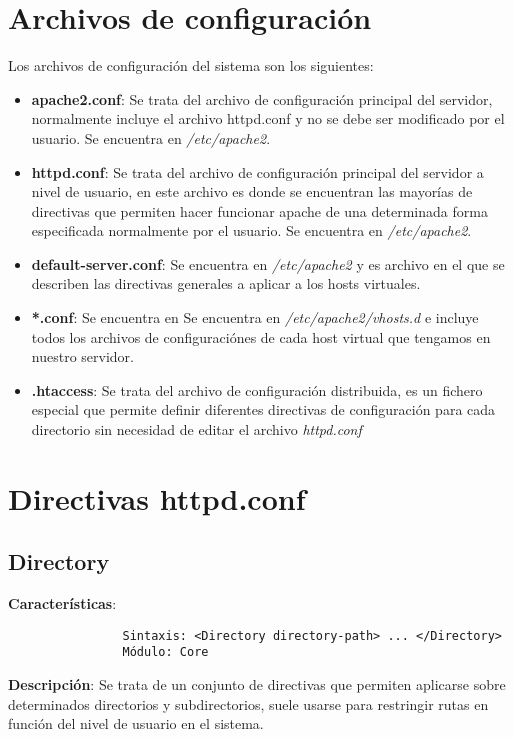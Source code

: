 \documentclass[a4paper, 11pt]{article} %
\begin{document}
\section{Archivos de configuración}
Los archivos de configuración del sistema son los siguientes: \cite{url3}
\begin{itemize}
	\item \textbf{apache2.conf}: Se trata del archivo de configuración principal del servidor, normalmente incluye el archivo httpd.conf y no se debe ser modificado por el usuario. Se encuentra en \textit{/etc/apache2}.
	\item \textbf{httpd.conf}: Se trata del archivo de configuración principal del servidor a nivel de usuario, en este archivo es donde se encuentran las mayorías de directivas que permiten hacer funcionar apache de una determinada forma especificada normalmente por el usuario. Se encuentra en \textit{/etc/apache2}.
	\item \textbf{default-server.conf}: Se encuentra en \textit{/etc/apache2} y es archivo en el que se describen las directivas generales a aplicar a los hosts virtuales.
	\item \textbf{*.conf}: Se encuentra en Se encuentra en \textit{/etc/apache2/vhosts.d} e incluye todos los archivos de configuraciónes de cada host virtual que tengamos en nuestro servidor.
	\item \textbf{.htaccess}: Se trata del archivo de configuración distribuida, es un fichero especial que permite definir diferentes directivas de configuración para cada directorio sin necesidad de editar el archivo \textit{httpd.conf}
\end{itemize}
\section{Directivas httpd.conf}
	\subsection{Directory}
		\textbf{Características}:
		\begin{verbatim}
				Sintaxis: <Directory directory-path> ... </Directory>
				Módulo: Core
		\end{verbatim}
		\textbf{Descripción}: Se trata de un conjunto de directivas que permiten aplicarse sobre determinados directorios y subdirectorios, suele usarse para restringir rutas en función del nivel de usuario en el sistema.
\end{document}
